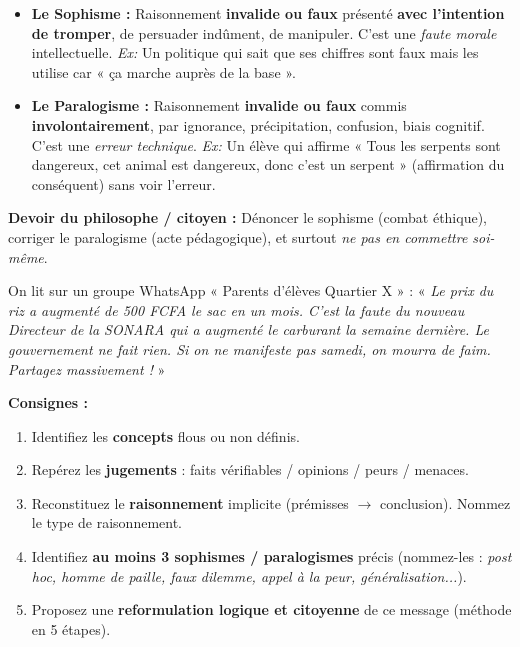 \documentclass[11pt]{article}
\newcounter{popsec}
\newcounter{popsub}
\newcommand{\courssub}[1]{%
  \stepcounter{popsub}%
  \par\vspace{9pt}\noindent{\popxbold\fontsize{11.5}{13}\selectfont\color{popink}{\color{poporange}\thepopsec.\thepopsub}\hspace{6pt}#1}\par\nopagebreak\vspace{4pt}
}
\begin{document}
\begin{definition}
\begin{itemize}
    \item \textbf{Le Sophisme :} Raisonnement \textbf{invalide ou faux} présenté \textbf{avec l'intention de tromper}, de persuader indûment, de manipuler. C'est une \emph{faute morale} intellectuelle. \textit{Ex:} Un politique qui sait que ses chiffres sont faux mais les utilise car « ça marche auprès de la base ».
    \item \textbf{Le Paralogisme :} Raisonnement \textbf{invalide ou faux} commis \textbf{involontairement}, par ignorance, précipitation, confusion, biais cognitif. C'est une \emph{erreur technique}. \textit{Ex:} Un élève qui affirme « Tous les serpents sont dangereux, cet animal est dangereux, donc c'est un serpent » (affirmation du conséquent) sans voir l'erreur.
\end{itemize}
\textbf{Devoir du philosophe / citoyen :} Dénoncer le sophisme (combat éthique), corriger le paralogisme (acte pédagogique), et surtout \emph{ne pas en commettre soi-même}.
\end{definition}

\courssub{Exercices d'entraînement}

\begin{exercice}
On lit sur un groupe WhatsApp « Parents d'élèves Quartier X » :
« \textit{Le prix du riz a augmenté de 500 FCFA le sac en un mois. C'est la faute du nouveau Directeur de la SONARA qui a augmenté le carburant la semaine dernière. Le gouvernement ne fait rien. Si on ne manifeste pas samedi, on mourra de faim. Partagez massivement ! } »

\textbf{Consignes :}
\begin{enumerate}
    \item Identifiez les \textbf{concepts} flous ou non définis.
    \item Repérez les \textbf{jugements} : faits vérifiables / opinions / peurs / menaces.
    \item Reconstituez le \textbf{raisonnement} implicite (prémisses $\rightarrow$ conclusion). Nommez le type de raisonnement.
    \item Identifiez \textbf{au moins 3 sophismes / paralogismes} précis (nommez-les : \textit{post hoc, homme de paille, faux dilemme, appel à la peur, généralisation...}).
    \item Proposez une \textbf{reformulation logique et citoyenne} de ce message (méthode en 5 étapes).
\end{enumerate}
\end{exercice}
\end{document}
